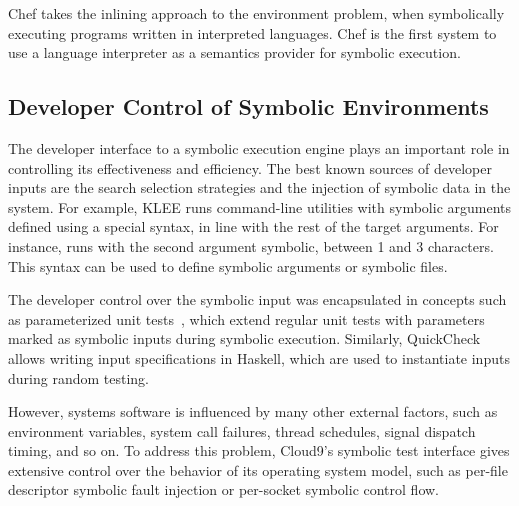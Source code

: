 Chef takes the inlining approach to the environment problem, when symbolically executing programs written in interpreted languages.  Chef is the first system to use a language interpreter as a semantics provider for symbolic execution.


\subsection{Developer Control of Symbolic Environments}

The developer interface to a symbolic execution engine plays an important role in controlling its effectiveness and efficiency.
%
The best known sources of developer inputs are the search selection strategies and the injection of symbolic data in the system.
%
For example, KLEE runs command-line utilities with symbolic arguments defined using a special syntax, in line with the rest of the target arguments.  For instance,  runs  with the second argument symbolic, between 1 and 3 characters.  This syntax can be used to define symbolic arguments or symbolic files.

The developer control over the symbolic input was encapsulated in concepts such as parameterized unit tests~\cite{tillmann-puts}, which extend regular unit tests with parameters marked as symbolic inputs during symbolic execution.
%
Similarly, QuickCheck~\cite{quickcheck} allows writing input specifications in Haskell, which are used to instantiate inputs during random testing.

However, systems software is influenced by many other external factors, such as environment variables, system call failures, thread schedules, signal dispatch timing, and so on.
%
To address this problem, Cloud9's symbolic test interface gives extensive control over the behavior of its operating system model, such as per-file descriptor symbolic fault injection or per-socket symbolic control flow.

